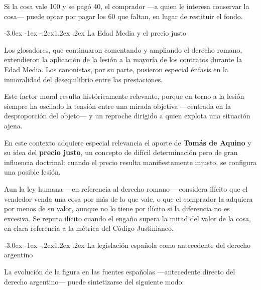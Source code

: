 \documentclass[12pt,oneside]{book}
\makeatletter
\renewcommand\section{\@startsection{section}{1}{\z@}%
  {-3.0ex \@plus -1ex \@minus -.2ex}{1.2ex \@plus .2ex}%
  {\normalfont\large\bfseries\color{acento}}}
\makeatother
\begin{document}
\begin{ejemplo}
Si la cosa vale 100 y se pagó 40, el comprador ---a quien le interesa conservar la cosa--- puede optar por pagar los 60 que faltan, en lugar de restituir el fondo.
\end{ejemplo}

\section{La Edad Media y el precio justo}

Los glosadores, que continuaron comentando y ampliando el derecho romano, extendieron la aplicación de la lesión a la mayoría de los contratos durante la Edad Media. Los canonistas, por su parte, pusieron especial énfasis en la inmoralidad del desequilibrio entre las prestaciones.

Este factor moral resulta históricamente relevante, porque en torno a la lesión siempre ha oscilado la tensión entre una mirada objetiva ---centrada en la desproporción del objeto--- y un reproche dirigido a quien explota una situación ajena.

En este contexto adquiere especial relevancia el aporte de \textbf{Tomás de Aquino} y su idea del \textbf{precio justo}, un concepto de difícil determinación pero de gran influencia doctrinal: cuando el precio resulta manifiestamente injusto, se configura una posible lesión.

\begin{regla}
Aun la ley humana ---en referencia al derecho romano--- considera ilícito que el vendedor venda una cosa por más de lo que vale, o que el comprador la adquiera por menos de su valor, aunque no lo tiene por ilícito si la diferencia no es excesiva. Se reputa ilícito cuando el engaño supera la mitad del valor de la cosa, en clara referencia a la métrica del Código Justinianeo.
\end{regla}

\section{La legislación española como antecedente del derecho argentino}

La evolución de la figura en las fuentes españolas ---antecedente directo del derecho argentino--- puede sintetizarse del siguiente modo:
\end{document}
